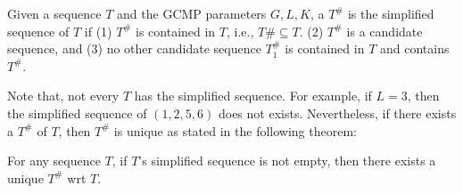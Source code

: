 
\begin{definition}
Given a sequence $T$ and the GCMP parameters $G,L,K$, a $T^\#$ is
the simplified sequence of $T$ if (1) $T^\#$ is contained in $T$, i.e., $T\# \subseteq T$.
(2) $T^\#$ is a candidate sequence, and (3) no other candidate sequence
$T^\#_1$ is contained in $T$ and contains $T^\#$.
\end{definition}
Note that, not every $T$ has the simplified sequence.  For example, if $L =3$,
then the simplified sequence of $(1,2,5,6)$ does not exists.
Nevertheless, if there exists a $T^\#$ of $T$, then $T^\#$ is unique
as stated in the following theorem:
\begin{theorem}
For any sequence $T$, if $T$'s simplified sequence is not empty, then
there exists a unique $T^\#$ wrt $T$.
\end{theorem}

